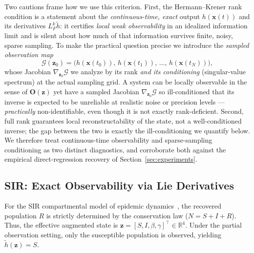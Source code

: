 Two cautions frame how we use this criterion. First, the Hermann--Krener rank condition is a statement about the \emph{continuous-time, exact} output $h(\mathbf{x}(t))$ and its derivatives $L_F^k\tilde h$: it certifies \emph{local weak observability} in an idealized information limit and is silent about how much of that information survives finite, noisy, sparse sampling. To make the practical question precise we introduce the \emph{sampled observation map}
\begin{equation}
\label{eq:sampled-map}
\mathcal{G}(\mathbf{z}_0)=\big(h(\mathbf{x}(t_0)),\,h(\mathbf{x}(t_1)),\,\ldots,\,h(\mathbf{x}(t_N))\big),
\end{equation}
whose Jacobian $\nabla_{\mathbf{z}_0}\mathcal{G}$ we analyze by its rank \emph{and its conditioning} (singular-value spectrum) at the actual sampling grid. A system can be locally observable in the sense of $\mathbf{O}(\mathbf{z})$ yet have a sampled Jacobian $\nabla_{\mathbf{z}_0}\mathcal{G}$ so ill-conditioned that its inverse is expected to be unreliable at realistic noise or precision levels --- \emph{practically} non-identifiable, even though it is not exactly rank-deficient. Second, full rank guarantees local reconstructability of the state, not a well-conditioned inverse; the gap between the two is exactly the ill-conditioning we quantify below. We therefore treat continuous-time observability and sparse-sampling conditioning as two distinct diagnostics, and corroborate both against the empirical direct-regression recovery of Section~\ref{sec:experiments}.

\subsection{SIR: Exact Observability via Lie Derivatives}
For the SIR compartmental model of epidemic dynamics~\cite{kermack1927contribution}, the recovered population $R$ is strictly determined by the conservation law ($N = S+I+R$). Thus, the effective augmented state is $\mathbf{z} = [S, I, \beta, \gamma]^\top \in \mathbb{R}^4$. Under the partial observation setting, only the susceptible population is observed, yielding $\tilde{h}(\mathbf{z}) = S$. 

